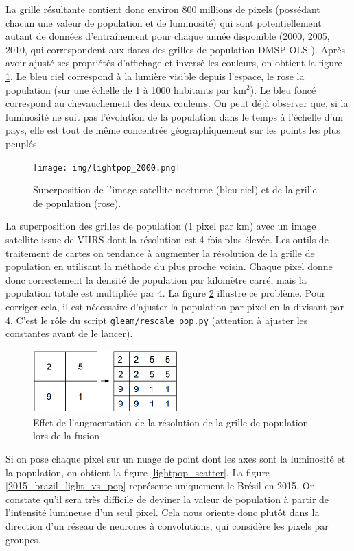 \documentclass[a4paper, 11pt]{report}
\begin{document}
La grille résultante contient donc environ 800 millions de pixels (possédant chacun une valeur de population et de luminosité) qui sont potentiellement autant de données d'entraînement pour chaque année disponible (2000, 2005, 2010, qui correspondent aux dates des grilles de population DMSP-OLS \cite{noaa}). Après avoir ajusté ses propriétés d'affichage et inversé les couleurs, on obtient la figure \ref{lightpop_2000}. Le bleu ciel correspond à la lumière visible depuis l'espace, le rose la population (sur une échelle de 1 à 1000 habitants par km$^2$). Le bleu foncé correspond au chevauchement des deux couleurs. On peut déjà observer que, si la luminosité ne suit pas l'évolution de la population dans le temps à l'échelle d'un pays, elle est tout de même concentrée géographiquement sur les points les plus peuplés.


\begin{figure}
	\centering
	\texttt{[image: img/lightpop\_2000.png]}
	\caption{Superposition de l'image satellite nocturne (bleu ciel) et de la grille de population (rose).}
	\label{lightpop_2000}
\end{figure}

La superposition des grilles de population (1 pixel par km) avec un image satellite issue de VIIRS \cite{noaa-viirs} dont la résolution est 4 fois plus élevée. Les outils de traitement de cartes on tendance à augmenter la résolution de la grille de population en utilisant la méthode du plus proche voisin. Chaque pixel donne donc correctement la densité de population par kilomètre carré, mais la population totale est multipliée par 4. La figure \ref{upsampling} illustre ce problème. Pour corriger cela, il est nécessaire d'ajuster la population par pixel en la divisant par 4. C'est le rôle du script \texttt{gleam/rescale\_pop.py} (attention à ajuster les constantes avant de le lancer).

\begin{figure}
	\centering
	\includegraphics[width=0.5\textwidth]{img/upsampling.png}
	\caption{Effet de l'augmentation de la résolution de la grille de population lors de la fusion}
	\label{upsampling}
\end{figure}

Si on pose chaque pixel sur un nuage de point dont les axes sont la luminosité et la population, on obtient la figure \ref{lightpop_scatter}. La figure \ref{2015_brazil_light_vs_pop} représente uniquement le Brésil en 2015. On constate qu'il sera très difficile de deviner la valeur de population à partir de l'intensité lumineuse d'un seul pixel. Cela nous oriente donc plutôt dans la direction d'un réseau de neurones à convolutions, qui considère les pixels par groupes.
\end{document}
